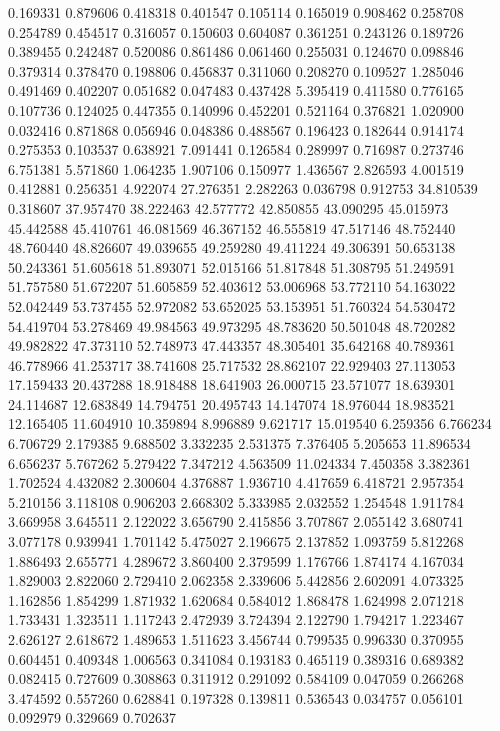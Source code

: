 0.169331
0.879606
0.418318
0.401547
0.105114
0.165019
0.908462
0.258708
0.254789
0.454517
0.316057
0.150603
0.604087
0.361251
0.243126
0.189726
0.389455
0.242487
0.520086
0.861486
0.061460
0.255031
0.124670
0.098846
0.379314
0.378470
0.198806
0.456837
0.311060
0.208270
0.109527
1.285046
0.491469
0.402207
0.051682
0.047483
0.437428
5.395419
0.411580
0.776165
0.107736
0.124025
0.447355
0.140996
0.452201
0.521164
0.376821
1.020900
0.032416
0.871868
0.056946
0.048386
0.488567
0.196423
0.182644
0.914174
0.275353
0.103537
0.638921
7.091441
0.126584
0.289997
0.716987
0.273746
6.751381
5.571860
1.064235
1.907106
0.150977
1.436567
2.826593
4.001519
0.412881
0.256351
4.922074
27.276351
2.282263
0.036798
0.912753
34.810539
0.318607
37.957470
38.222463
42.577772
42.850855
43.090295
45.015973
45.442588
45.410761
46.081569
46.367152
46.555819
47.517146
48.752440
48.760440
48.826607
49.039655
49.259280
49.411224
49.306391
50.653138
50.243361
51.605618
51.893071
52.015166
51.817848
51.308795
51.249591
51.757580
51.672207
51.605859
52.403612
53.006968
53.772110
54.163022
52.042449
53.737455
52.972082
53.652025
53.153951
51.760324
54.530472
54.419704
53.278469
49.984563
49.973295
48.783620
50.501048
48.720282
49.982822
47.373110
52.748973
47.443357
48.305401
35.642168
40.789361
46.778966
41.253717
38.741608
25.717532
28.862107
22.929403
27.113053
17.159433
20.437288
18.918488
18.641903
26.000715
23.571077
18.639301
24.114687
12.683849
14.794751
20.495743
14.147074
18.976044
18.983521
12.165405
11.604910
10.359894
8.996889
9.621717
15.019540
6.259356
6.766234
6.706729
2.179385
9.688502
3.332235
2.531375
7.376405
5.205653
11.896534
6.656237
5.767262
5.279422
7.347212
4.563509
11.024334
7.450358
3.382361
1.702524
4.432082
2.300604
4.376887
1.936710
4.417659
6.418721
2.957354
5.210156
3.118108
0.906203
2.668302
5.333985
2.032552
1.254548
1.911784
3.669958
3.645511
2.122022
3.656790
2.415856
3.707867
2.055142
3.680741
3.077178
0.939941
1.701142
5.475027
2.196675
2.137852
1.093759
5.812268
1.886493
2.655771
4.289672
3.860400
2.379599
1.176766
1.874174
4.167034
1.829003
2.822060
2.729410
2.062358
2.339606
5.442856
2.602091
4.073325
1.162856
1.854299
1.871932
1.620684
0.584012
1.868478
1.624998
2.071218
1.733431
1.323511
1.117243
2.472939
3.724394
2.122790
1.794217
1.223467
2.626127
2.618672
1.489653
1.511623
3.456744
0.799535
0.996330
0.370955
0.604451
0.409348
1.006563
0.341084
0.193183
0.465119
0.389316
0.689382
0.082415
0.727609
0.308863
0.311912
0.291092
0.584109
0.047059
0.266268
3.474592
0.557260
0.628841
0.197328
0.139811
0.536543
0.034757
0.056101
0.092979
0.329669
0.702637
